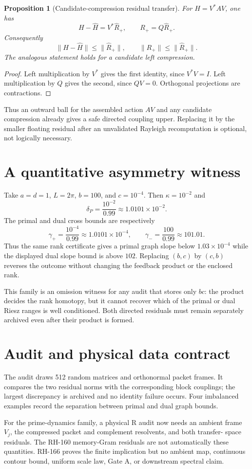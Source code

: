 \documentclass[12pt]{article}
\newtheorem{proposition}[theorem]{Proposition}
\newcommand{\norm}[1]{\lVert#1\rVert}
\begin{document}
\begin{proposition}[Candidate-compression residual transfer]
For $H=V^*AV$, one has
\[
 H-\widehat H=V^*\widehat R_+,
 \qquad R_+=Q\widehat R_+.
\]
Consequently
\[
 \norm{H-\widehat H}\le\norm{\widehat R_+},
 \qquad \norm{R_+}\le\norm{\widehat R_+}.
\]
The analogous statement holds for a candidate left compression.
\end{proposition}
\begin{proof}
Left multiplication by $V^*$ gives the first identity, since $V^*V=I$.
Left multiplication by $Q$ gives the second, since $QV=0$.  Orthogonal
projections are contractions.
\end{proof}

Thus an outward ball for the assembled action $AV$ and any candidate
compression already gives a safe directed coupling upper.  Replacing it by
the smaller floating residual after an unvalidated Rayleigh recomputation is
optional, not logically necessary.

\section{A quantitative asymmetry witness}
Take $a=d=1$, $L=2\pi$, $b=100$, and $c=10^{-4}$.  Then
$\kappa=10^{-2}$ and
\[
 \delta_P=\frac{10^{-2}}{0.99}\approx1.0101\times10^{-2}.
\]
The primal and dual cross bounds are respectively
\[
 \gamma_+=\frac{10^{-4}}{0.99}\approx1.0101\times10^{-4},
 \qquad
 \gamma_-=\frac{100}{0.99}\approx101.01.
\]
Thus the same rank certificate gives a primal graph slope below
$1.03\times10^{-4}$ while the displayed dual slope bound is above $102$.
Replacing $(b,c)$ by $(c,b)$ reverses the outcome without changing the
feedback product or the enclosed rank.

This family is an omission witness for any audit that stores only $bc$: the
product decides the rank homotopy, but it cannot recover which of the primal
or dual Riesz ranges is well conditioned.  Both directed residuals must
remain separately archived even after their product is formed.

\section{Audit and physical data contract}
The audit draws 512 random matrices and orthonormal packet frames.  It
compares the two residual norms with the corresponding block couplings; the
largest discrepancy is archived and no identity failure occurs.  Four
imbalanced examples record the separation between primal and dual graph
bounds.

For the prime-dynamics family, a physical R audit now needs an ambient frame
$V_j$, the compressed packet and complement resolvents, and both transfer-
space residuals.  The RH-160 memory-Gram residuals are not automatically
these quantities.  RH-166 proves the finite implication but no ambient map,
continuous contour bound, uniform scale law, Gate A, or downstream spectral
claim.



\end{document}
